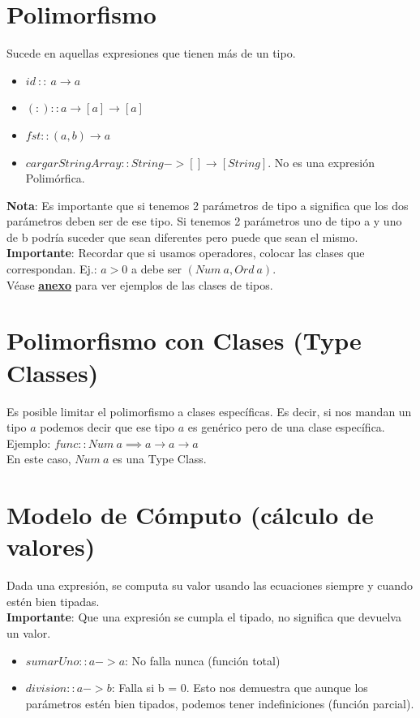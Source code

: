 \documentclass[10pt,a4paper]{article}
\begin{document}
\section*{Polimorfismo}
Sucede en aquellas expresiones que tienen más de un tipo. 
\begin{itemize}
    \item $ id \ :: \ a \rightarrow a $
    \item $(:) :: a \rightarrow [a] \rightarrow [a]$
    \item $fst :: (a, b) \rightarrow a$
    \item $cargarStringArray :: String -> [] \rightarrow [String]$. No es una expresión Polimórfica.
\end{itemize}
\textbf{Nota}: Es importante que si tenemos 2 parámetros de tipo a significa que los dos parámetros deben ser de ese tipo. Si tenemos 2 parámetros uno de tipo a y uno de b podría suceder que sean diferentes pero puede que sean el mismo. 
\textbf{Importante}: Recordar que si usamos operadores, colocar las clases que correspondan. Ej.: $a>0$ a debe ser $(Num \ a, Ord \ a)$. \\
Véase \hyperref[subsec:clases_tipos]{\underline{\textbf{anexo}}} para ver ejemplos de las clases de tipos.
\section*{Polimorfismo con Clases (Type Classes)}
Es posible limitar el polimorfismo a clases específicas. Es decir, si nos mandan un tipo $a$ podemos decir que ese tipo $a$ es genérico pero de una clase específica. \\
Ejemplo: $func :: Num \ a \implies a \rightarrow a \rightarrow a$ \\
En este caso, $Num \ a $ es una Type Class.
\section*{Modelo de Cómputo (cálculo de valores)}
Dada una expresión, se computa su valor usando las ecuaciones siempre y cuando estén bien tipadas. \\
\textbf{Importante}: Que una expresión se cumpla el tipado, no significa que devuelva un valor.
\begin{itemize}
    \item $sumarUno :: a -> a$: No falla nunca (función total)
    \item $division :: a -> b$: Falla si b = 0. Esto nos demuestra que aunque los parámetros estén bien tipados, podemos tener indefiniciones (función parcial).
\end{itemize}
\end{document}
